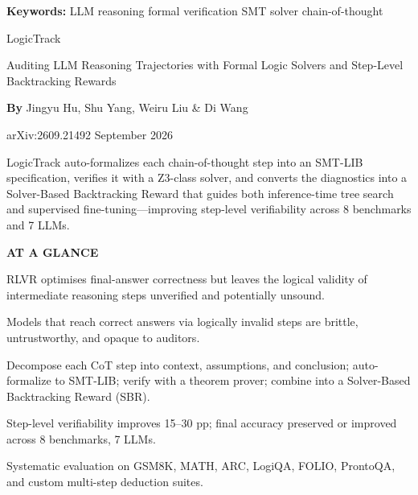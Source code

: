 \documentclass[10pt,twocolumn]{article}
\begin{document}
\setlength{\parindent}{0pt}
\setlength{\parskip}{4pt}

{\small\color{keywordgray}\textbf{Keywords:}
  LLM reasoning \textbullet{}
  formal verification \textbullet{}
  SMT solver \textbullet{}
  chain-of-thought}\par\vspace{4pt}

{\LARGE\bfseries\raggedright
  LogicTrack}\par\vspace{4pt}

{\large\itshape\raggedright
  Auditing LLM Reasoning Trajectories with Formal Logic Solvers and
  Step-Level Backtracking Rewards}\par\vspace{6pt}

{\small\textbf{By} Jingyu Hu, Shu Yang, Weiru Liu \& Di Wang}\par\vspace{2pt}

{\small\color{keywordgray}arXiv:2609.21492 \textbullet{} September 2026}
\par\vspace{2pt}\noindent{\color{rulered}\rule{\columnwidth}{0.6pt}}\vspace{6pt}

LogicTrack auto-formalizes each chain-of-thought step into an SMT-LIB
specification, verifies it with a Z3-class solver, and converts the
diagnostics into a Solver-Based Backtracking Reward that guides both
inference-time tree search and supervised fine-tuning---improving
step-level verifiability across 8 benchmarks and 7 LLMs.

\begin{mdframed}[backgroundcolor=boxgray,linecolor=rulered,linewidth=1pt,
    innerleftmargin=6pt,innerrightmargin=6pt,
    innertopmargin=6pt,innerbottommargin=6pt]
\textbf{\small AT A GLANCE}\par\vspace{4pt}
\begin{description}[leftmargin=0pt,labelsep=4pt,itemsep=2pt,parsep=0pt,
    font=\small\bfseries]
  \item[Problem:] RLVR optimises final-answer correctness but leaves the
    logical validity of intermediate reasoning steps unverified and
    potentially unsound.
  \item[Why it matters:] Models that reach correct answers via logically
    invalid steps are brittle, untrustworthy, and opaque to auditors.
  \item[Method:] Decompose each CoT step into context, assumptions, and
    conclusion; auto-formalize to SMT-LIB; verify with a theorem prover;
    combine into a Solver-Based Backtracking Reward (SBR).
  \item[Result:] Step-level verifiability improves 15--30 pp; final
    accuracy preserved or improved across 8 benchmarks, 7 LLMs.
  \item[Evidence:] Systematic evaluation on GSM8K, MATH, ARC, LogiQA,
    FOLIO, ProntoQA, and custom multi-step deduction suites.
\end{description}
\end{mdframed}
\end{document}
